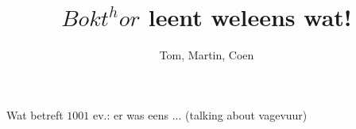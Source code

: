 \documentclass[openany]{article}
\title{$Bokt^{h}or$ leent weleens wat!}
\author{Tom, Martin, Coen}
\begin{document}
\maketitle

\tableofcontents
{}



\begin{songs}{} %



\renewcommand{\lyricfont}{\sffamily\large}




\setcounter{songnum}{666}

			
			
			
			


		\beginscripture{()}
			Wat betreft $1001$ ev.: er was eens ...
			(talking about vagevuur) 
		\endscripture



\setcounter{songnum}{1001}  
			
			
	
	
	
\end{songs}




\end{document}
